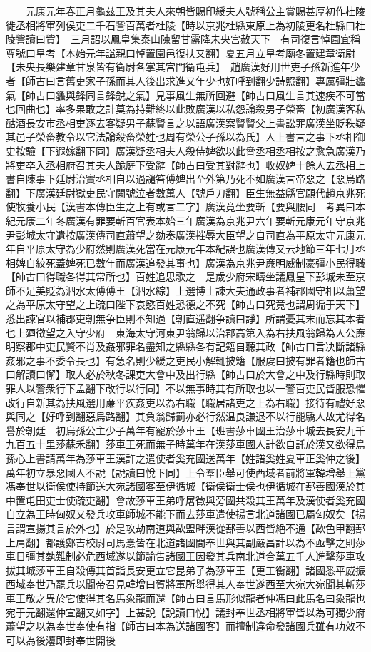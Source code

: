 　　元康元年春正月龜兹王及其夫人來朝皆賜印綬夫人號稱公主賞賜甚厚初作杜陵徙丞相將軍列侯吏二千石訾百萬者杜陵【時以京兆杜縣東原上為初陵更名杜縣曰杜陵訾讀曰貲】　三月詔以鳳皇集泰山陳留甘露降未央宫赦天下　有司復言悼園宜稱尊號曰皇考【本始元年諡親曰悼置園邑復扶又翻】夏五月立皇考廟冬置建章衛尉【未央長樂建章甘泉皆有衛尉各掌其宫門衛屯兵】　趙廣漢好用世吏子孫新進年少者【師古曰言舊吏家子孫而其人後出求進又年少也好呼到翻少詩照翻】專厲彊壯蠭氣【師古曰蠭與鋒同言鋒銳之氣】見事風生無所回避【師古曰風生言其速疾不可當也回曲也】率多果敢之計莫為持難終以此敗廣漢以私怨論殺男子榮畜【初廣漢客私酤酒長安市丞相吏逐去客疑男子蘇賢言之以語廣漢案賢賢父上書訟罪廣漢坐貶秩疑其邑子榮畜教令以它法論殺畜榮姓也周有榮公子孫以為氏】人上書言之事下丞相御史按驗【下遐嫁翻下同】廣漢疑丞相夫人殺侍婢欲以此脅丞相丞相按之愈急廣漢乃將吏卒入丞相府召其夫人跪庭下受辭【師古曰受其對辭也】收奴婢十餘人去丞相上書自陳事下廷尉治實丞相自以過譴笞傅婢出至外第乃死不如廣漢言帝惡之【惡烏路翻】下廣漢廷尉獄吏民守闕號泣者數萬人【號戶刀翻】臣生無益縣官願代趙京兆死使牧養小民【漢書本傳臣生之上有或言二字】廣漢竟坐要斬【要與腰同　考異曰本紀元康二年冬廣漢有罪要斬百官表本始三年廣漢為京兆尹六年要斬元康元年守京兆尹彭城太守遺按廣漢傳司直蕭望之劾奏廣漢摧辱大臣望之自司直為平原太守元康元年自平原太守為少府然則廣漢死當在元康元年本紀誤也廣漢傳又云地節三年七月丞相婢自絞死蓋婢死已數年而廣漢追發其事也】廣漢為京兆尹亷明威制豪彊小民得職【師古曰得職各得其常所也】百姓追思歌之　是歲少府宋疇坐議鳳皇下彭城未至京師不足美貶為泗水太傅傅王【泗水綜】上選博士諫大夫通政事者補郡國守相以蕭望之為平原太守望之上疏曰陛下哀愍百姓恐德之不究【師古曰究竟也謂周徧于天下】悉出諫官以補郡吏朝無争臣則不知過【朝直遥翻争讀曰諍】所謂憂其末而忘其本者也上廼徵望之入守少府　東海太守河東尹翁歸以治郡高第入為右扶風翁歸為人公亷明察郡中吏民賢不肖及姦邪罪名盡知之縣縣各有記籍自聽其政【師古曰言决斷諸縣姦邪之事不委令長也】有急名則少緩之吏民小解輒披籍【服䖍曰披有罪者籍也師古曰解讀曰懈】取人必於秋冬課吏大會中及出行縣【師古曰於大會之中及行縣時則取罪人以警衆行下孟翻下改行以行同】不以無事時其有所取也以一警百吏民皆服恐懼改行自新其為扶風選用亷平疾姦吏以為右職【職居諸吏之上為右職】接待有禮好惡與同之【好呼到翻惡烏路翻】其負翁歸罰亦必行然温良謙退不以行能驕人故尤得名譽於朝廷　初烏孫公主少子萬年有寵於莎車王【班書莎車國王治莎車城去長安九千九百五十里莎蘇禾翻】莎車王死而無子時萬年在漢莎車國人計欲自託於漢又欲得烏孫心上書請萬年為莎車王漢許之遣使者奚充國送萬年【姓譜奚姓夏車正奚仲之後】萬年初立暴惡國人不說【說讀曰悅下同】上令羣臣舉可使西域者前將軍韓增舉上黨馮奉世以衛侯使持節送大宛諸國客至伊循城【衛侯衛士侯也伊循城在鄯善國漢於其中置屯田吏士使疏吏翻】會故莎車王弟呼屠徵與旁國共殺其王萬年及漢使者奚充國自立為王時匈奴又發兵攻車師城不能下而去莎車遣使揚言北道諸國已屬匈奴矣【揚言謂宣揚其言於外也】於是攻劫南道與歃盟畔漢從鄯善以西皆絶不通【歃色甲翻鄯上肩翻】都護鄭吉校尉司馬憙皆在北道諸國間奉世與其副嚴昌計以為不亟擊之則莎車日彊其埶難制必危西域遂以節諭告諸國王因發其兵南北道合萬五千人進擊莎車攻拔其城莎車王自殺傳其首詣長安更立它昆弟子為莎車王【更工衡翻】諸國悉平威振西域奉世乃罷兵以聞帝召見韓增曰賀將軍所舉得其人奉世遂西至大宛大宛聞其斬莎車王敬之異於它使得其名馬象龍而還【師古曰言馬形似龍者仲馮曰此馬名曰象龍也宛于元翻還仲宣翻又如字】上甚說【說讀曰悅】議封奉世丞相將軍皆以為可獨少府蕭望之以為奉世奉使有指【師古曰本為送諸國客】而擅制違命發諸國兵雖有功效不可以為後灋即封奉世開後